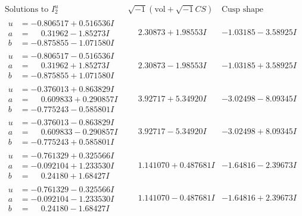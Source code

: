 \documentclass[1p]{elsarticle_modified}
\theoremstyle{definition}
\newcommand{\I}{\sqrt{-1}}
\begin{document}
$$\begin{array}{c|c|c}  
\text{Solutions to }I^u_{2}& \I (\text{vol} + \sqrt{-1}CS) & \text{Cusp shape}\\
 \hline 
\begin{aligned}
u &= -0.806517 + 0.516536 I \\
a &= \phantom{-}0.31962 - 1.85273 I \\
b &= -0.875855 - 1.071580 I\end{aligned}
 & \phantom{-}2.30873 + 1.98553 I & -1.03185 - 3.58925 I \\ \hline\begin{aligned}
u &= -0.806517 - 0.516536 I \\
a &= \phantom{-}0.31962 + 1.85273 I \\
b &= -0.875855 + 1.071580 I\end{aligned}
 & \phantom{-}2.30873 - 1.98553 I & -1.03185 + 3.58925 I \\ \hline\begin{aligned}
u &= -0.376013 + 0.863829 I \\
a &= \phantom{-}0.609833 + 0.290857 I \\
b &= -0.775243 - 0.585801 I\end{aligned}
 & \phantom{-}3.92717 + 5.34920 I & -3.02498 - 8.09345 I \\ \hline\begin{aligned}
u &= -0.376013 - 0.863829 I \\
a &= \phantom{-}0.609833 - 0.290857 I \\
b &= -0.775243 + 0.585801 I\end{aligned}
 & \phantom{-}3.92717 - 5.34920 I & -3.02498 + 8.09345 I \\ \hline\begin{aligned}
u &= -0.761329 + 0.325566 I \\
a &= -0.092104 + 1.233530 I \\
b &= \phantom{-}0.24180 + 1.68427 I\end{aligned}
 & \phantom{-}1.141070 + 0.487681 I & -1.64816 - 2.39673 I \\ \hline\begin{aligned}
u &= -0.761329 - 0.325566 I \\
a &= -0.092104 - 1.233530 I \\
b &= \phantom{-}0.24180 - 1.68427 I\end{aligned}
 & \phantom{-}1.141070 - 0.487681 I & -1.64816 + 2.39673 I \\ \hline\begin{aligned}

\end{aligned}
\end{array}$$
\end{document}
